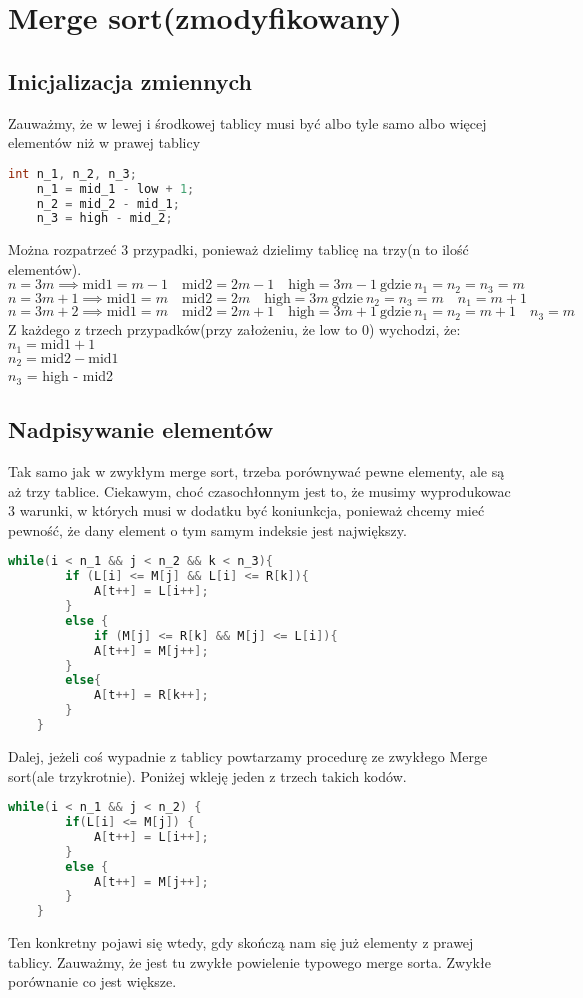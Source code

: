 \documentclass[12pt,a4paper]{article}
\begin{document}
\section{Merge sort(zmodyfikowany)}
\subsection{Inicjalizacja zmiennych}
Zauważmy, że w lewej i środkowej tablicy musi być albo tyle samo albo więcej elementów niż w prawej tablicy\\
\begin{lstlisting}[language=C++]   
    int n_1, n_2, n_3;
    n_1 = mid_1 - low + 1;
    n_2 = mid_2 - mid_1;
    n_3 = high - mid_2;
\end{lstlisting}
Można rozpatrzeć 3 przypadki, ponieważ dzielimy tablicę na trzy(n to ilość elementów).
$$ n=3m \implies \text{mid1}=m-1 \quad \text{mid2}=2m-1 \quad \text{high}=3m-1 \ \text{gdzie} \ n_1=n_2=n_3=m $$
$$ n=3m+1 \implies \text{mid1}=m \quad \text{mid2}=2m \quad \text{high}=3m \ \text{gdzie} \ n_2=n_3=m \quad n_1=m+1$$
$$n=3m+2 \implies \text{mid1}=m \quad \text{mid2}=2m +1 \quad \text{high}=3m +1 \ \text{gdzie} \ n_1=n_2=m+1 \quad n_3=m$$
Z każdego z trzech przypadków(przy założeniu, że low to 0) wychodzi, że:\\ $n_1 = \text{mid1} +1$\\
$n_2 = \text{mid2} - \text{mid1}$\\
$n_3$ = high - mid2
\clearpage
\subsection{Nadpisywanie elementów}
Tak samo jak w zwykłym merge sort, trzeba porównywać pewne elementy, ale są aż trzy tablice. Ciekawym, choć czasochłonnym jest to, że musimy wyprodukowac 3 warunki, w których musi w dodatku być koniunkcja, ponieważ chcemy mieć pewność, że dany element o tym samym indeksie jest największy.
\begin{lstlisting}[language=C++]
    while(i < n_1 && j < n_2 && k < n_3){
        if (L[i] <= M[j] && L[i] <= R[k]){
            A[t++] = L[i++];
        }
        else {
            if (M[j] <= R[k] && M[j] <= L[i]){
            A[t++] = M[j++];
        }
        else{
            A[t++] = R[k++];
        }
    }
\end{lstlisting}
Dalej, jeżeli coś wypadnie z tablicy powtarzamy procedurę ze zwykłego Merge sort(ale trzykrotnie). Poniżej wkleję jeden z trzech takich kodów.
\begin{lstlisting}[language=C++]
    while(i < n_1 && j < n_2) {
        if(L[i] <= M[j]) {
            A[t++] = L[i++];
        }
        else {
            A[t++] = M[j++];
        }
    }
\end{lstlisting}
Ten konkretny pojawi się wtedy, gdy skończą nam się już elementy z prawej tablicy. Zauważmy, że jest tu zwykłe powielenie typowego merge sorta. Zwykłe porównanie co jest większe.
\clearpage
\end{document}
